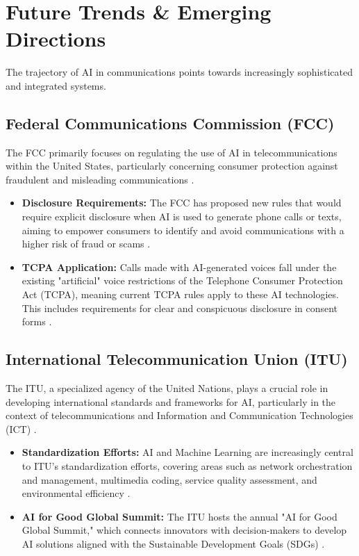 \section{Future Trends \& Emerging Directions}
The trajectory of AI in communications points towards increasingly sophisticated and integrated systems.

\subsection{Federal Communications Commission (FCC)}
The FCC primarily focuses on regulating the use of AI in telecommunications within the United States, particularly concerning consumer protection against fraudulent and misleading communications \cite{Tecknexus_FCC}.
\begin{itemize}
    \item \textbf{Disclosure Requirements:} The FCC has proposed new rules that would require explicit disclosure when AI is used to generate phone calls or texts, aiming to empower consumers to identify and avoid communications with a higher risk of fraud or scams \cite{Manatt_FCC, GlobalPolicyWatch_FCC}.
    \item \textbf{TCPA Application:} Calls made with AI-generated voices fall under the existing "artificial" voice restrictions of the Telephone Consumer Protection Act (TCPA), meaning current TCPA rules apply to these AI technologies. This includes requirements for clear and conspicuous disclosure in consent forms \cite{KelleyDrye_FCC, MayerBrown_FCC}.
\end{itemize}

\subsection{International Telecommunication Union (ITU)}
The ITU, a specialized agency of the United Nations, plays a crucial role in developing international standards and frameworks for AI, particularly in the context of telecommunications and Information and Communication Technologies (ICT) \cite{DigitalRegulation_ITU}.
\begin{itemize}
    \item \textbf{Standardization Efforts:} AI and Machine Learning are increasingly central to ITU's standardization efforts, covering areas such as network orchestration and management, multimedia coding, service quality assessment, and environmental efficiency \cite{TeletimesInternational_ITU, ITU_AI_Standards}.
    \item \textbf{AI for Good Global Summit:} The ITU hosts the annual "AI for Good Global Summit," which connects innovators with decision-makers to develop AI solutions aligned with the Sustainable Development Goals (SDGs) \cite{OECD_AI_ITU}.
\end{itemize}

